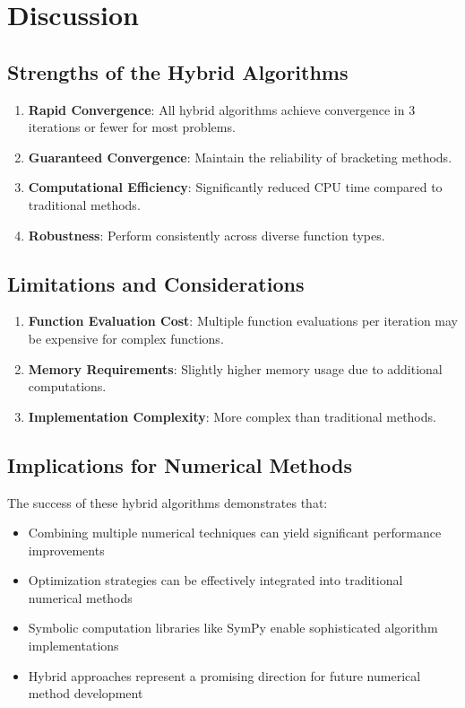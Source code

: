\documentclass[11pt,a4paper]{article}
\begin{document}
\section{Discussion}

\subsection{Strengths of the Hybrid Algorithms}

\begin{enumerate}
    \item \textbf{Rapid Convergence}: All hybrid algorithms achieve convergence in 3 iterations or fewer for most problems.
    \item \textbf{Guaranteed Convergence}: Maintain the reliability of bracketing methods.
    \item \textbf{Computational Efficiency}: Significantly reduced CPU time compared to traditional methods.
    \item \textbf{Robustness}: Perform consistently across diverse function types.
\end{enumerate}

\subsection{Limitations and Considerations}

\begin{enumerate}
    \item \textbf{Function Evaluation Cost}: Multiple function evaluations per iteration may be expensive for complex functions.
    \item \textbf{Memory Requirements}: Slightly higher memory usage due to additional computations.
    \item \textbf{Implementation Complexity}: More complex than traditional methods.
\end{enumerate}

\subsection{Implications for Numerical Methods}

The success of these hybrid algorithms demonstrates that:

\begin{itemize}
    \item Combining multiple numerical techniques can yield significant performance improvements
    \item Optimization strategies can be effectively integrated into traditional numerical methods
    \item Symbolic computation libraries like SymPy enable sophisticated algorithm implementations
    \item Hybrid approaches represent a promising direction for future numerical method development
\end{itemize}
\end{document}
